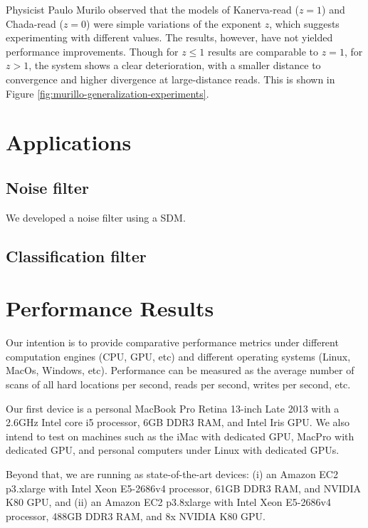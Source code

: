 Physicist Paulo Murilo observed that the models of Kanerva-read ($z=1$) and Chada-read ($z=0$) were simple variations of the exponent $z$, which suggests experimenting with different values. The results, however, have not yielded performance improvements.  Though for $z \leq 1$ results are comparable to $z=1$, for $z>1$, the system shows a clear deterioration, with a smaller distance to convergence and higher divergence at large-distance reads. This is shown in Figure \ref{fig:murillo-generalization-experiments}.



\section{Applications}

\subsection{Noise filter}

We developed a noise filter using a SDM.


\subsection{Classification filter}


\section{Performance Results}

Our intention is to provide comparative performance metrics under different computation engines (CPU, GPU, etc) and different operating systems (Linux, MacOs, Windows, etc). Performance can be measured as the average number of scans of all hard locations per second, reads per second, writes per second, etc.

Our first device is a personal MacBook Pro Retina 13-inch Late 2013 with a 2.6GHz Intel core i5 processor, 6GB DDR3 RAM, and Intel Iris GPU.  We also intend to test on machines such as the iMac with dedicated GPU, MacPro with dedicated GPU, and personal computers under Linux with dedicated GPUs.

Beyond that, we are running as state-of-the-art devices: (i) an Amazon EC2 p3.xlarge with Intel Xeon E5-2686v4 processor, 61GB DDR3 RAM, and NVIDIA K80 GPU, and (ii) an Amazon EC2 p3.8xlarge with Intel Xeon E5-2686v4 processor, 488GB DDR3 RAM, and 8x NVIDIA K80 GPU.


